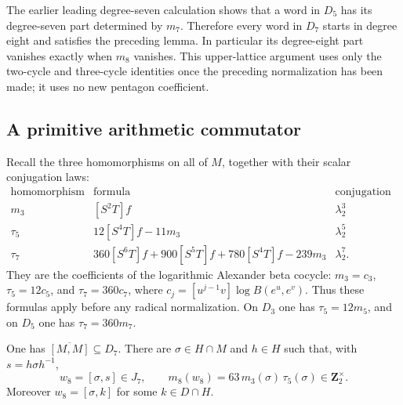 The earlier leading degree-seven calculation shows that a word in
$D_5$ has its degree-seven part determined by $m_7$. Therefore every
word in $D_7$ starts in degree eight and satisfies the preceding
lemma. In particular its degree-eight part vanishes exactly when
$m_8$ vanishes. This upper-lattice argument uses only the two-cycle
and three-cycle identities once the preceding normalization has
been made; it uses no new pentagon coefficient.

\subsection{A primitive arithmetic commutator}

Recall the three homomorphisms on all of $M$, together with their
scalar conjugation laws:
\[
 \begin{array}{c|c|c}
  \text{homomorphism}&\text{formula}&\text{conjugation weight}\\ \hline
  m_3 &[S^2T]f&\lambda_2^3\\
  \tau_5&12[S^4T]f-11m_3&\lambda_2^5\\
  \tau_7&360[S^6T]f+900[S^5T]f+780[S^4T]f-239m_3
            &\lambda_2^7.
 \end{array}
\]
They are the coefficients of the logarithmic Alexander beta
cocycle: $m_3=c_3$, $\tau_5=12c_5$, and $\tau_7=360c_7$, where
$c_j=[u^{j-1}v]\log B(e^u,e^v)$. Thus these formulas apply before
any radical normalization. On $D_3$ one has $\tau_5=12m_5$, and
on $D_5$ one has $\tau_7=360m_7$.

\begin{lemma}\label{lem:weight-eight-arithmetic-commutator}
One has $\overline{[M,M]}\subseteq D_7$. There are
$\sigma\in H\cap M$ and $h\in H$ such that, with
$s=h\sigma h^{-1}$,
\[
 w_8=[\sigma,s]\in J_7,
 \qquad m_8(w_8)=63\,m_3(\sigma)\,\tau_5(\sigma)
                 \in\mathbf Z_2^\times.
\]
Moreover $w_8=[\sigma,k]$ for some $k\in D\cap H$.
\end{lemma}

